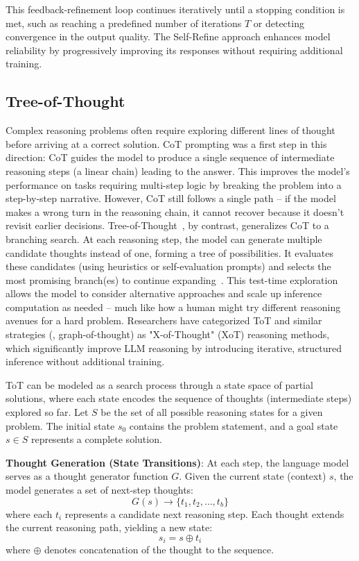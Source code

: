 This feedback-refinement loop continues iteratively until a stopping condition is met, such as reaching a predefined number of iterations $T$ or detecting convergence in the output quality. The Self-Refine approach enhances model reliability by progressively improving its responses without requiring additional training.

\subsection{Tree-of-Thought}

Complex reasoning problems often require exploring different lines of thought before arriving at a correct solution. CoT prompting was a first step in this direction: CoT guides the model to produce a single sequence of intermediate reasoning steps (a linear chain) leading to the answer. This improves the model’s performance on tasks requiring multi-step logic by breaking the problem into a step-by-step narrative. However, CoT still follows a single path – if the model makes a wrong turn in the reasoning chain, it cannot recover because it doesn’t revisit earlier decisions. Tree-of-Thought~\citep{yao2023tree}, by contrast, generalizes CoT to a branching search. At each reasoning step, the model can generate multiple candidate thoughts instead of one, forming a tree of possibilities. It evaluates these candidates (using heuristics or self-evaluation prompts) and selects the most promising branch(es) to continue expanding~\citep{bi2024forest}. This test-time exploration allows the model to consider alternative approaches and scale up inference computation as needed – much like how a human might try different reasoning avenues for a hard problem. Researchers have categorized ToT and similar strategies (\eg, graph-of-thought) as "X-of-Thought" (XoT) reasoning methods, which significantly improve LLM reasoning by introducing iterative, structured inference without additional training.

ToT can be modeled as a search process through a state space of partial solutions, where each state encodes the sequence of thoughts (intermediate steps) explored so far. Let $S$ be the set of all possible reasoning states for a given problem. The initial state $s_0$ contains the problem statement, and a goal state $s \in S$ represents a complete solution.

\textbf{Thought Generation (State Transitions)}: At each step, the language model serves as a thought generator function $G$. Given the current state (context) $s$, the model generates a set of next-step thoughts:
\begin{equation}
    G(s) \rightarrow \{t_1, t_2, \dots, t_b\}
\end{equation}
where each $t_i$ represents a candidate next reasoning step. Each thought extends the current reasoning path, yielding a new state:
\begin{equation}
    s_i = s \oplus t_i
\end{equation}
where $\oplus$ denotes concatenation of the thought to the sequence.

